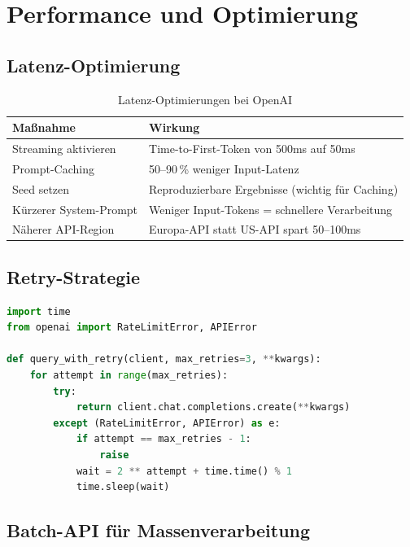 \section{Performance und Optimierung}

\subsection{Latenz-Optimierung}

\begin{table}[H]
\centering
\begin{tabularx}{\linewidth}{lX}
\toprule
\textbf{Maßnahme} & \textbf{Wirkung} \\
\midrule
Streaming aktivieren & Time-to-First-Token von 500ms auf 50ms \\
Prompt-Caching & 50--90\,\% weniger Input-Latenz \\
Seed setzen & Reproduzierbare Ergebnisse (wichtig für Caching) \\
Kürzerer System-Prompt & Weniger Input-Tokens = schnellere Verarbeitung \\
Näherer API-Region & Europa-API statt US-API spart 50--100ms \\
\bottomrule
\end{tabularx}
\caption{Latenz-Optimierungen bei OpenAI}
\label{tab:latency-openai}
\end{table}

\subsection{Retry-Strategie}

\begin{lstlisting}[language=Python, caption={Retry mit Exponential Backoff}, label=lst:retry]
import time
from openai import RateLimitError, APIError

def query_with_retry(client, max_retries=3, **kwargs):
    for attempt in range(max_retries):
        try:
            return client.chat.completions.create(**kwargs)
        except (RateLimitError, APIError) as e:
            if attempt == max_retries - 1:
                raise
            wait = 2 ** attempt + time.time() % 1
            time.sleep(wait)
\end{lstlisting}

\subsection{Batch-API für Massenverarbeitung}

